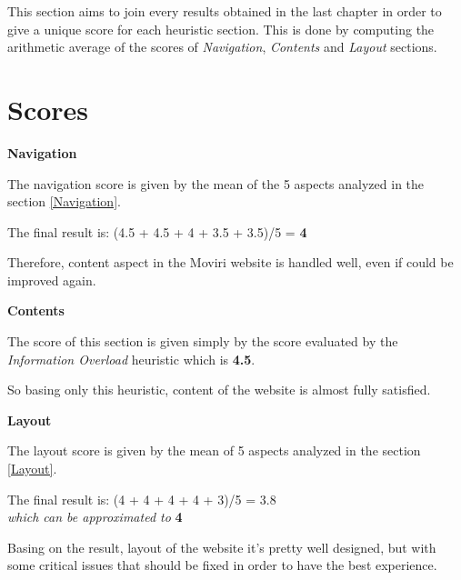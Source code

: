This section aims to join every results obtained in the last chapter in order to give a unique score for each heuristic section. This is done by computing the arithmetic average of the scores of \textit{Navigation}, \textit{Contents} and \textit{Layout} sections.\par
\bigskip
\section{Scores}
\textbf{Navigation}\par
The navigation score is given by the mean of the 5 aspects analyzed in the section \ref{Navigation}. \par 
The final result is: 
(4.5 + 4.5 + 4 + 3.5 + 3.5)/5 = \textbf{4}\par
Therefore, content aspect in the Moviri website is handled well, even if could be improved again.
\par\medskip

\textbf{Contents}\par
The score of this section is given simply by the score evaluated by the \textit{Information Overload} heuristic which is \textbf{4.5}. \par
So basing only this heuristic, content of the website is almost fully satisfied.
\par\medskip

\textbf{Layout}\par
The layout score is given by the mean of 5 aspects analyzed in the section \ref{Layout}. \par
The final result is: 
(4 + 4 + 4 + 4 + 3)/5 = 3.8 \\
\textit{which can be approximated to} \textbf{4}\par
Basing on the result, layout of the website it's pretty well designed, but with some critical issues that should be fixed in order to have the best experience.